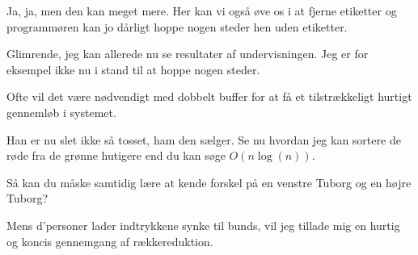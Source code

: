 \documentclass[a4paper,11pt]{article}
\begin{document}
\begin{sketch}
 Ja, ja, men den kan meget mere.  Her kan vi også øve os i at
fjerne etiketter  og programmøren kan
jo dårligt hoppe nogen steder hen uden etiketter.

 Glimrende, jeg kan allerede nu se resultater af
undervisningen.  Jeg er for eksempel ikke nu i stand til at hoppe
nogen steder.

 Ofte vil det være nødvendigt med dobbelt buffer for at få
et tilstrækkeligt hurtigt gennemløb i systemet.  

 Han er nu slet ikke så tosset, ham den sælger. Se nu hvordan
jeg kan sortere de røde fra de grønne hutigere end du kan søge
$O(n\log(n))$. 

  Så kan du måske samtidig lære
at kende forskel på en venstre Tuborg og en højre Tuborg?

 Mens d'personer lader indtrykkene synke til bunds, vil jeg
tillade mig en hurtig og koncis gennemgang af rækkereduktion.


\end{sketch}
\end{document}
